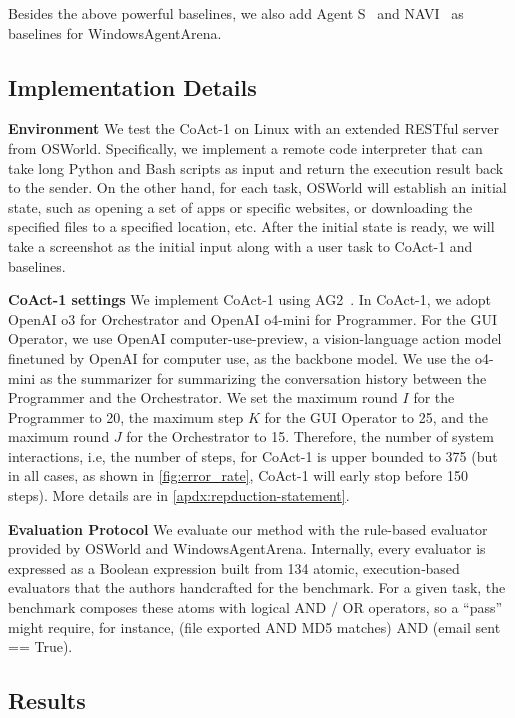\documentclass{article} %
\newcommand{\ours}{CoAct-1\xspace}
\begin{document}
Besides the above powerful baselines, we also add Agent S~\citep{agashe2024agent} and NAVI~\citep{bonatti2024windowsagentarenaevaluating} as baselines for WindowsAgentArena.

\subsection{Implementation Details}
\noindent\textbf{Environment} We test the \ours on Linux with an extended RESTful server from OSWorld. Specifically, we implement a remote code interpreter that can take long Python and Bash scripts as input and return the execution result back to the sender. On the other hand, for each task, OSWorld will establish an initial state, such as opening a set of apps or specific websites, or downloading the specified files to a specified location, etc. After the initial state is ready, we will take a screenshot as the initial input along with a user task to \ours and baselines.

\noindent\textbf{\ours settings} We implement \ours using AG2~\citep{wu2023autogenenablingnextgenllm}. In \ours, we adopt OpenAI o3 for Orchestrator and OpenAI o4-mini for Programmer. For the GUI Operator, we use OpenAI computer-use-preview, a vision-language action model finetuned by OpenAI for computer use, as the backbone model. We use the o4-mini as the summarizer for summarizing the conversation history between the Programmer and the Orchestrator. We set the maximum round $I$ for the Programmer to 20, the maximum step $K$ for the GUI Operator to 25, and the maximum round $J$ for the Orchestrator to 15. Therefore, the number of system interactions, i.e, the number of steps, for \ours is upper bounded to 375 (but in all cases, as shown in \autoref{fig:error_rate}, \ours will early stop before 150 steps). More details are in \autoref{apdx:repduction-statement}.

\noindent\textbf{Evaluation Protocol}
We evaluate our method with the rule-based evaluator provided by OSWorld and WindowsAgentArena. Internally, every evaluator is expressed as a Boolean expression built from 134 atomic, execution‑based evaluators that the authors handcrafted for the benchmark. For a given task, the benchmark composes these atoms with logical AND / OR operators, so a “pass” might require, for instance, (file exported AND MD5 matches) AND (email sent == True).


\subsection{Results}
\end{document}
